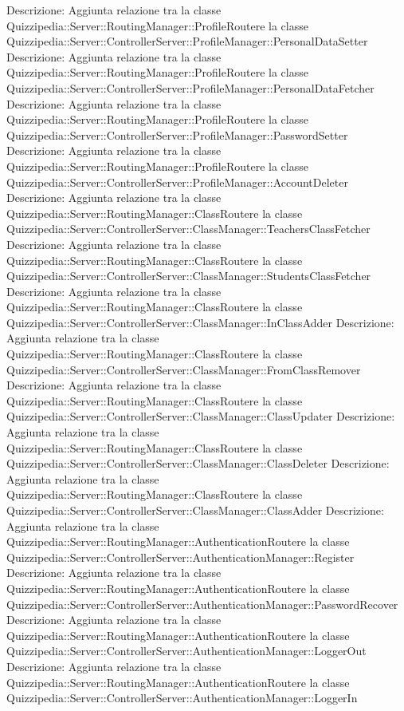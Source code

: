 Descrizione: Aggiunta relazione tra la classe Quizzipedia::Server::RoutingManager::ProfileRoutere la classe Quizzipedia::Server::ControllerServer::ProfileManager::PersonalDataSetter 
Descrizione: Aggiunta relazione tra la classe Quizzipedia::Server::RoutingManager::ProfileRoutere la classe Quizzipedia::Server::ControllerServer::ProfileManager::PersonalDataFetcher 
Descrizione: Aggiunta relazione tra la classe Quizzipedia::Server::RoutingManager::ProfileRoutere la classe Quizzipedia::Server::ControllerServer::ProfileManager::PasswordSetter 
Descrizione: Aggiunta relazione tra la classe Quizzipedia::Server::RoutingManager::ProfileRoutere la classe Quizzipedia::Server::ControllerServer::ProfileManager::AccountDeleter 
Descrizione: Aggiunta relazione tra la classe Quizzipedia::Server::RoutingManager::ClassRoutere la classe Quizzipedia::Server::ControllerServer::ClassManager::TeachersClassFetcher 
Descrizione: Aggiunta relazione tra la classe Quizzipedia::Server::RoutingManager::ClassRoutere la classe Quizzipedia::Server::ControllerServer::ClassManager::StudentsClassFetcher 
Descrizione: Aggiunta relazione tra la classe Quizzipedia::Server::RoutingManager::ClassRoutere la classe Quizzipedia::Server::ControllerServer::ClassManager::InClassAdder 
Descrizione: Aggiunta relazione tra la classe Quizzipedia::Server::RoutingManager::ClassRoutere la classe Quizzipedia::Server::ControllerServer::ClassManager::FromClassRemover 
Descrizione: Aggiunta relazione tra la classe Quizzipedia::Server::RoutingManager::ClassRoutere la classe Quizzipedia::Server::ControllerServer::ClassManager::ClassUpdater 
Descrizione: Aggiunta relazione tra la classe Quizzipedia::Server::RoutingManager::ClassRoutere la classe Quizzipedia::Server::ControllerServer::ClassManager::ClassDeleter 
Descrizione: Aggiunta relazione tra la classe Quizzipedia::Server::RoutingManager::ClassRoutere la classe Quizzipedia::Server::ControllerServer::ClassManager::ClassAdder 
Descrizione: Aggiunta relazione tra la classe Quizzipedia::Server::RoutingManager::AuthenticationRoutere la classe Quizzipedia::Server::ControllerServer::AuthenticationManager::Register 
Descrizione: Aggiunta relazione tra la classe Quizzipedia::Server::RoutingManager::AuthenticationRoutere la classe Quizzipedia::Server::ControllerServer::AuthenticationManager::PasswordRecover 
Descrizione: Aggiunta relazione tra la classe Quizzipedia::Server::RoutingManager::AuthenticationRoutere la classe Quizzipedia::Server::ControllerServer::AuthenticationManager::LoggerOut 
Descrizione: Aggiunta relazione tra la classe Quizzipedia::Server::RoutingManager::AuthenticationRoutere la classe Quizzipedia::Server::ControllerServer::AuthenticationManager::LoggerIn 
